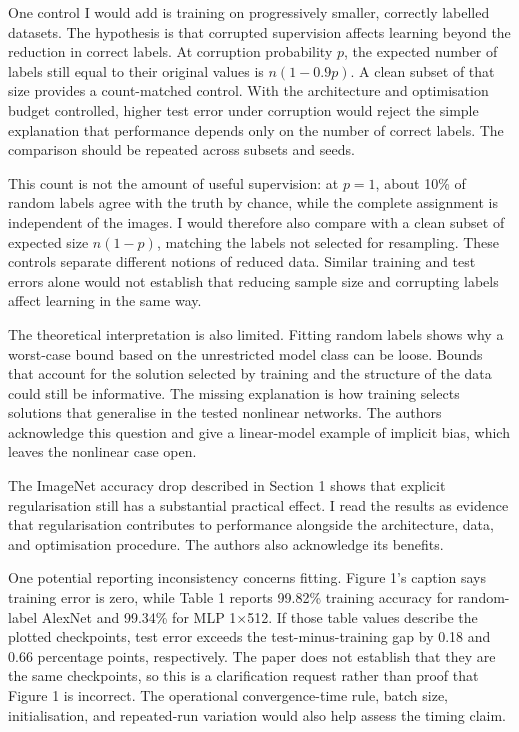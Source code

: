 \documentclass[11pt]{article}
\begin{document}
One control I would add is training on progressively smaller, correctly labelled datasets. The hypothesis is that corrupted supervision affects learning beyond the reduction in correct labels. At corruption probability $p$, the expected number of labels still equal to their original values is $n(1-0.9p)$. A clean subset of that size provides a count-matched control. With the architecture and optimisation budget controlled, higher test error under corruption would reject the simple explanation that performance depends only on the number of correct labels. The comparison should be repeated across subsets and seeds.

This count is not the amount of useful supervision: at $p=1$, about 10\% of random labels agree with the truth by chance, while the complete assignment is independent of the images. I would therefore also compare with a clean subset of expected size $n(1-p)$, matching the labels not selected for resampling. These controls separate different notions of reduced data. Similar training and test errors alone would not establish that reducing sample size and corrupting labels affect learning in the same way.

The theoretical interpretation is also limited. Fitting random labels shows why a worst-case bound based on the unrestricted model class can be loose. Bounds that account for the solution selected by training and the structure of the data could still be informative. The missing explanation is how training selects solutions that generalise in the tested nonlinear networks. The authors acknowledge this question and give a linear-model example of implicit bias, which leaves the nonlinear case open.

The ImageNet accuracy drop described in Section 1 shows that explicit regularisation still has a substantial practical effect. I read the results as evidence that regularisation contributes to performance alongside the architecture, data, and optimisation procedure. The authors also acknowledge its benefits.

One potential reporting inconsistency concerns fitting. Figure 1's caption says training error is zero, while Table 1 reports 99.82\% training accuracy for random-label AlexNet and 99.34\% for MLP 1$\times$512. If those table values describe the plotted checkpoints, test error exceeds the test-minus-training gap by 0.18 and 0.66 percentage points, respectively. The paper does not establish that they are the same checkpoints, so this is a clarification request rather than proof that Figure 1 is incorrect. The operational convergence-time rule, batch size, initialisation, and repeated-run variation would also help assess the timing claim.
\end{document}
